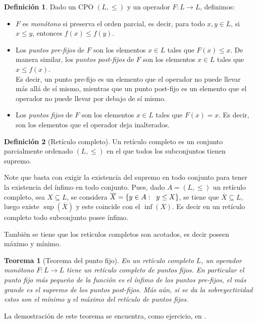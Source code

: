 \documentclass[11pt,oneside]{report}
\theoremstyle{plain}
\newtheorem{teo}{Teorema}[chapter]
\theoremstyle{definition}
\newtheorem{defi}{Definición}[chapter]
\begin{document}
\begin{defi}
    Dado un CPO $(L, \leq)$ y un operador $F: L \rightarrow L$, definimos:
    \begin{itemize}
        \item $F$ es \emph{monótono} si preserva el orden parcial, es decir, para todo $x, y \in L$, si $x \leq y$, entonces $f(x) \leq f(y)$.
        \item Los \emph{puntos pre-fijos} de $F$ son los elementos $x \in L$ tales que $F(x) \leq x$. De manera similar, los \emph{puntos post-fijos} de $F$ son los elementos $x \in L$ tales que $x \leq f(x)$.\\
              Es decir, un punto pre-fijo es un elemento que el operador no puede llevar más allá de sí mismo, mientras que un punto post-fijo es un elemento que el operador no puede llevar por debajo de sí mismo.
        \item Los \emph{puntos fijos} de $F$ son los elementos $x \in L$ tales que $F(x) = x$. Es decir, son los elementos que el operador deja inalterados.
    \end{itemize}
\end{defi}
\begin{defi}[Retículo completo]
    Un retículo completo es un conjunto parcialmente ordenado $(L,\leq)$ en el que todos los subconjuntos tienen supremo.
\end{defi}
Note que basta con exigir la existencia del supremo en todo conjunto para tener la existencia del ínfimo en todo conjunto. Pues, dado $A=(L,\leq)$ un retículo completo, sea $X \subseteq L$, se considera $\overline{X} = \{y\in A : \hspace{2mm} y \leq X\}$, se tiene que  $\overline{X} \subseteq L$, luego existe $\sup(\overline{X})$ y este coincide con el $\inf(X)$.
Es decir en un retículo completo todo subconjunto posee ínfimo.

También se tiene que los retículos completos son acotados, es decir poseen máximo y mínimo.

\begin{teo}[Teorema del punto fijo]
    En un retículo completo $L$, un operador monótono $F:L\rightarrow L$ tiene un retículo completo de puntos fijos. En particular el punto fijo más pequeño de la función es el ínfimo de los puntos pre-fijos, el más grande es el supremo de los puntos post-fijos. Más aún, si se da la sobreyectividad estos son el mínimo y el máximo del retículo de puntos fijos.
\end{teo}
La demostración de este teorema se encuentra, como ejercicio, en \cite{Davide Sangiorgi}.
\end{document}
